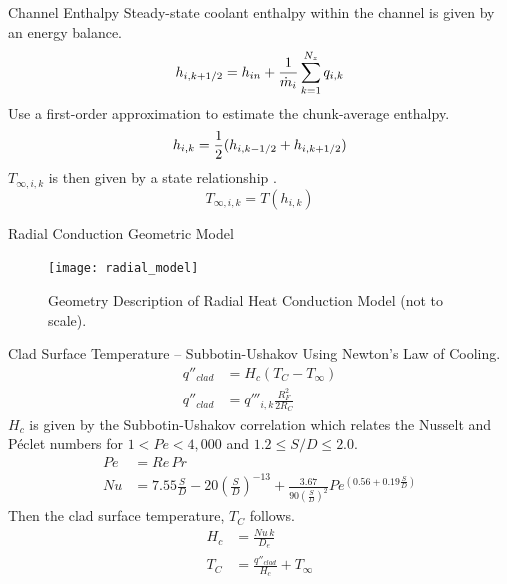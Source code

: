 \begin{frame}{Channel Enthalpy}
  Steady-state coolant enthalpy within the channel is given by an energy
  balance.
  \begin{equation}
    h_{i,k+1/2} = h_{in} + \frac{1}{\dot{m}_i} \sum_{k=1}^{N_z} q_{i,k}
  \end{equation}
  Use a first-order approximation to estimate the chunk-average enthalpy.
  \begin{equation}
    h_{i,k} = \frac{1}{2} (h_{i,k-1/2}+h_{i,k+1/2})
  \end{equation}
  $T_{\infty,i,k}$ is then given by a state relationship \cite{sodiumProp}.
  \begin{equation}
    T_{\infty,i,k} = T(h_{i,k})
  \end{equation}
\end{frame}

\begin{frame}{Radial Conduction Geometric Model}
  \begin{figure}
    \centering
    \texttt{[image: radial\_model]}
    \caption{Geometry Description of Radial Heat Conduction Model (not to
      scale).}
    \label{fig:radial_model}
  \end{figure}
\end{frame}

\begin{frame}{Clad Surface Temperature -- Subbotin-Ushakov}
  Using Newton's Law of Cooling.
  \begin{align}
    q''_{clad} &= H_c (T_C - T_{\infty}) \\
    q''_{clad} &= q'''_{i,k} \frac{R_F^2}{2 R_C}
  \end{align}
  $H_c$ is given by the Subbotin-Ushakov correlation \cite{subbotinUshakov}
  which relates the Nusselt and P\'eclet numbers for ${1 < Pe < 4,000}$ and 
  ${ 1.2 \le S/D \le 2.0 }$.
  \begin{align}
    Pe &= Re \, Pr \\
    \label{eq:subbotinUshakov}
    Nu &= 7.55 \frac{S}{D} - 20 \left(\frac{S}{D}\right)^{-13} + 
      \frac{3.67}{90\left(\frac{S}{D}\right)^{2}}
      Pe^{\left(0.56 + 0.19 \frac{S}{D}\right)}
  \end{align}
  Then the clad surface temperature, $T_C$ follows.
  \begin{align}
    H_c &= \frac{N\!u \, k}{D_e} \\
    T_C &= \frac{q''_{clad}}{H_c} + T_{\infty}
  \end{align}
\end{frame}

